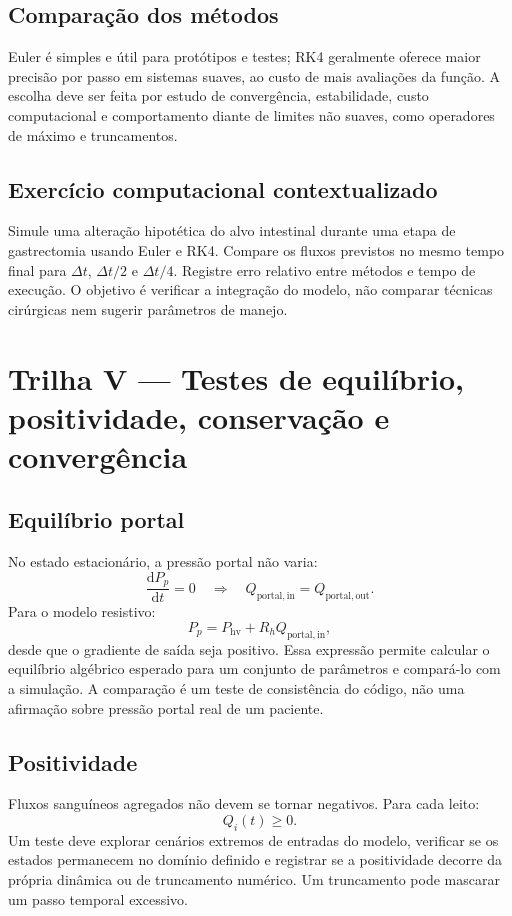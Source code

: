 \documentclass[11pt,a4paper,oneside]{book}
\newcommand{\diff}[2]{\frac{\mathrm{d}#1}{\mathrm{d}#2}}
\newcommand{\Qportin}{Q_{\mathrm{portal,in}}}
\newcommand{\Qportout}{Q_{\mathrm{portal,out}}}
\begin{document}
\section{Comparação dos métodos}
Euler é simples e útil para protótipos e testes; RK4 geralmente oferece maior precisão por passo em sistemas suaves, ao custo de mais avaliações da função. A escolha deve ser feita por estudo de convergência, estabilidade, custo computacional e comportamento diante de limites não suaves, como operadores de máximo e truncamentos.

\section{Exercício computacional contextualizado}
Simule uma alteração hipotética do alvo intestinal durante uma etapa de gastrectomia usando Euler e RK4. Compare os fluxos previstos no mesmo tempo final para $\Delta t$, $\Delta t/2$ e $\Delta t/4$. Registre erro relativo entre métodos e tempo de execução. O objetivo é verificar a integração do modelo, não comparar técnicas cirúrgicas nem sugerir parâmetros de manejo.

\chapter{Trilha V — Testes de equilíbrio, positividade, conservação e convergência}

\section{Equilíbrio portal}
No estado estacionário, a pressão portal não varia:
\begin{equation}
\diff{P_p}{t}=0
\quad\Longrightarrow\quad
\Qportin=\Qportout.
\end{equation}
Para o modelo resistivo:
\[
P_p=P_{\mathrm{hv}}+R_h\Qportin,
\]
desde que o gradiente de saída seja positivo. Essa expressão permite calcular o equilíbrio algébrico esperado para um conjunto de parâmetros e compará-lo com a simulação. A comparação é um teste de consistência do código, não uma afirmação sobre pressão portal real de um paciente.

\section{Positividade}
Fluxos sanguíneos agregados não devem se tornar negativos. Para cada leito:
\[
Q_i(t)\geq0.
\]
Um teste deve explorar cenários extremos de entradas do modelo, verificar se os estados permanecem no domínio definido e registrar se a positividade decorre da própria dinâmica ou de truncamento numérico. Um truncamento pode mascarar um passo temporal excessivo.
\end{document}
